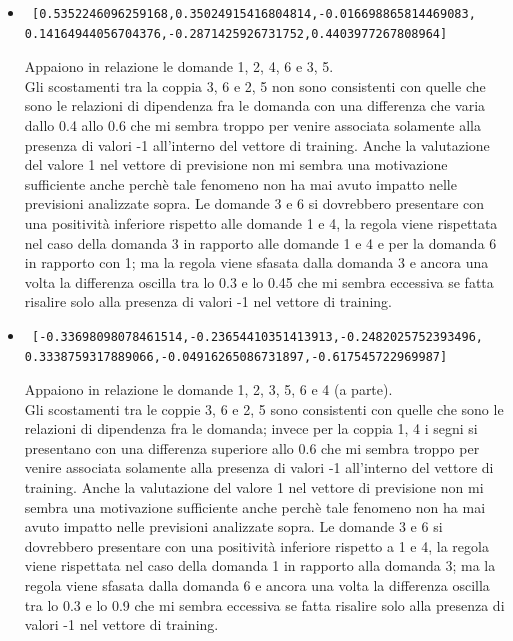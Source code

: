 \begin{itemize}
\item \begin{verbatim} [0.5352246096259168,0.35024915416804814,-0.016698865814469083,
0.14164944056704376,-0.2871425926731752,0.4403977267808964]
\end{verbatim}
Appaiono in relazione le domande 1, 2, 4, 6  e 3, 5.\\
Gli scostamenti tra la coppia 3, 6 e 2, 5 non sono consistenti con quelle che sono le relazioni di dipendenza fra le domanda con una differenza che varia dallo 0.4 allo 0.6 che mi sembra troppo per venire associata solamente alla presenza di valori -1 all'interno del vettore di training. Anche la valutazione del valore 1 nel vettore di previsione non mi sembra una motivazione sufficiente anche perch\`e tale fenomeno non ha mai avuto impatto nelle previsioni analizzate sopra.
Le domande 3 e 6 si dovrebbero presentare con una positivit\`a inferiore rispetto alle domande 1 e 4, la regola viene rispettata nel caso della domanda 3 in rapporto alle domande 1 e 4 e per la domanda 6 in rapporto con 1; ma la regola viene sfasata dalla domanda 3 e ancora una volta la differenza oscilla tra lo 0.3 e lo 0.45 che mi sembra eccessiva se fatta risalire solo alla presenza di valori -1 nel vettore di training.


\item \begin{verbatim} [-0.33698098078461514,-0.23654410351413913,-0.2482025752393496,
0.3338759317889066,-0.04916265086731897,-0.617545722969987]
\end{verbatim}
Appaiono in relazione le domande 1, 2, 3, 5, 6 e 4 (a parte).\\
Gli scostamenti tra le coppie 3, 6 e 2, 5 sono consistenti con quelle che sono le relazioni di dipendenza fra le domanda; invece per la coppia 1, 4 i segni si presentano con una differenza superiore allo 0.6 che mi sembra troppo per venire associata solamente alla presenza di valori -1 all'interno del vettore di training. Anche la valutazione del valore 1 nel vettore di previsione non mi sembra una motivazione sufficiente anche perch\`e tale fenomeno non ha mai avuto impatto nelle previsioni analizzate sopra.
Le domande 3 e 6 si dovrebbero presentare con una positivit\`a inferiore rispetto a 1 e 4, la regola viene rispettata nel caso della domanda 1 in rapporto alla domanda 3; ma la regola viene sfasata dalla domanda 6 e ancora una volta la differenza oscilla tra lo 0.3 e lo 0.9 che mi sembra eccessiva se fatta risalire solo alla presenza di valori -1 nel vettore di training.
\end{itemize}

